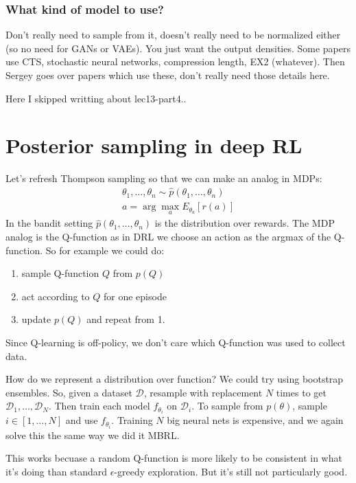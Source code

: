 \documentclass{report}
\newcommand{\argmax}{\arg\!\max}
\begin{document}
\subsubsection{What kind of model to use?}
Don't really need to sample from it, doesn't really need to be normalized either (so no need for GANs or VAEs).
You just want the output densities. 
Some papers use CTS, stochastic neural networks, compression length, EX2 (whatever).
Then Sergey goes over papers which use these, don't really need those details here.

Here I skipped writting about lec13-part4..

\section{Posterior sampling in deep RL}
Let's refresh Thompson sampling so that we can make an analog in MDPs:
\begin{gather}
		\theta_1, \dots, \theta_n \sim \hat{p} (\theta_1, \dots, \theta_n) \\
		a = \argmax_a E_{\theta_a} \left[ r(a) \right] 
\end{gather}
In the bandit setting $ \hat{p}(\theta_1, \dots, \theta_n)  $ is the distribution over rewards.
The MDP analog is the Q-function as in DRL we choose an action as the argmax of the Q-function.
So for example we could do:
\begin{enumerate}
		\item sample Q-function $Q$ from $p(Q)$
		\item act according to $Q$ for one episode
		\item update $p(Q)$ and repeat from 1.
\end{enumerate}
Since Q-learning is off-policy, we don't care which Q-function was used to collect data.

How do we represent a distribution over function?
We could try using bootstrap ensembles.
So, given a dataset $\mathcal{D}$, resample with replacement $N$ times to get $\mathcal{D}_1, \dots, \mathcal{D}_N$.
Then train each model $f_{\theta_i}$ on $ \mathcal{D}_i  $.
To sample from $ p(\theta)  $, sample $ i \in [1, \dots, N]  $ and use $ f_{\theta_i}  $.
Training $N$ big neural nets is expensive, and we again solve this the same way we did it MBRL.

This works becuase a random Q-function is more likely to be consistent in what it's doing than
standard $\epsilon$-greedy exploration. But it's still not particularly good.
\end{document}
